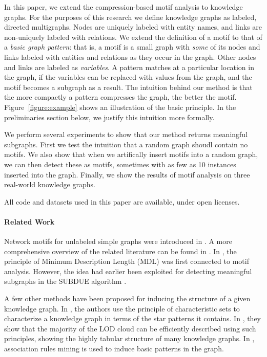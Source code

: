 \documentclass[letterpaper]{article} %
\begin{document}
In this paper, we extend the compression-based motif analysis to knowledge graphs. For the purposes of this research we define knowledge graphs as labeled, directed multigraphs. Nodes are uniquely labeled with entity names, and links are non-uniquely labeled with relations.  We extend the definition of a motif to that of a \emph{basic graph pattern}: that is, a motif is a small graph with \emph{some} of its nodes and links labeled with entities and relations as they occur in the graph. Other nodes and links are labeled as \emph{variables}. A pattern matches at a particular location in the graph, if the variables can be replaced with values from the graph, and the motif becomes a subgraph as a result. 
The intuition behind our method is that the more compactly a pattern compresses the graph, the better the motif. Figure~\ref{figure:example} shows an illustration of the basic principle. In the preliminaries section below, we justify this intuition more formally.

We perform several experiments to show that our method returns meaningful subgraphs. First we test the intuition that a random graph shoudl contain no motifs. We also show that when we artifically insert motifs into a random graph, we can then detect these as motifs, sometimes with as few as 10 instances inserted into the graph. Finally, we show the results of motif analysis on three real-world knowledge graphs.

All code and datasets used in this paper are available, under open licenses.\footnotemark


\paragraph{Related Work}

Network motifs for unlabeled simple graphs were introduced in \cite{milo2002network}. A more comprehensive overview of the related literature can be found in \cite[Section~1.1]{bloem2017large}. In \cite{bloem2017large}, the principle of Minimum Description Length (MDL) was first connected to motif analysis. However, the idea had earlier been exploited for detecting meaningful subgraphs in the SUBDUE algorithm \cite{cook1994substructure}.

A few other methods have been proposed for inducing the structure of a given knowledge graph. In \cite{pham2015deriving}, the authors use the principle of characteristic sets to characterize a knowledge graph in terms of the star patterns it contains. In \cite{pham2016exploiting}, they show that the majority of the LOD cloud can be efficiently described using such principles, showing the highly tabular structure of many knowledge graphs. In \cite{volker2011statistical}, association rules mining is used to induce basic patterns in the graph. 
\end{document}

